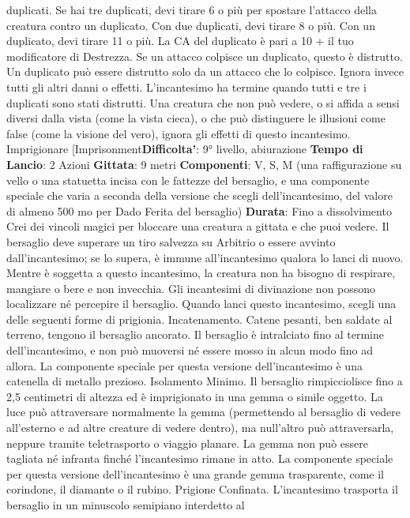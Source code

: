 \begin{multicols}{2}
duplicati.
Se hai tre duplicati, devi tirare 6 o più per spostare
l’attacco della creatura contro un duplicato. Con due
duplicati, devi tirare 8 o più. Con un duplicato, devi
tirare 11 o più.
La CA del duplicato è pari a 10 + il tuo modificatore di
Destrezza. Se un attacco colpisce un duplicato, questo
è distrutto. Un duplicato può essere distrutto solo da un
attacco che lo colpisce. Ignora invece tutti gli altri danni
o effetti. L’incantesimo ha termine quando tutti e tre i
duplicati sono stati distrutti.
Una creatura che non può vedere, o si affida a sensi
diversi dalla vista (come la vista cieca), o che può 
distinguere le illusioni come false (come la visione del
vero), ignora gli effetti di questo incantesimo.
Imprigionare
[Imprisonment\textbf{Difficolta'}:
9° livello, abiurazione
\textbf{Tempo di Lancio}: 2 Azioni
\textbf{Gittata}: 9 metri
\textbf{Componenti}: V, S, M (una raffigurazione su vello o una
statuetta incisa con le fattezze del bersaglio, e una
componente speciale che varia a seconda della
versione che scegli dell’incantesimo, del valore di
almeno 500 mo per Dado Ferita del bersaglio)
\textbf{Durata}: Fino a dissolvimento
Crei dei vincoli magici per bloccare una creatura a
gittata e che puoi vedere. Il bersaglio deve superare un
tiro salvezza su Arbitrio o essere avvinto
dall’incantesimo; se lo supera, è immune
all’incantesimo qualora lo lanci di nuovo. Mentre è
soggetta a questo incantesimo, la creatura non ha
bisogno di respirare, mangiare o bere e non invecchia.
Gli incantesimi di divinazione non possono localizzare
né percepire il bersaglio.
Quando lanci questo incantesimo, scegli una delle
seguenti forme di prigionia.
Incatenamento. Catene pesanti, ben saldate al
terreno, tengono il bersaglio ancorato. Il bersaglio è
intralciato fino al termine dell’incantesimo, e non può
muoversi né essere mosso in alcun modo fino ad allora.
La componente speciale per questa versione
dell’incantesimo è una catenella di metallo prezioso.
Isolamento Minimo. Il bersaglio rimpicciolisce fino a
2,5 centimetri di altezza ed è imprigionato in una
gemma o simile oggetto. La luce può attraversare
normalmente la gemma (permettendo al bersaglio di
vedere all’esterno e ad altre creature di vedere dentro),
ma null’altro può attraversarla, neppure tramite
teletrasporto o viaggio planare. La gemma non può
essere tagliata né infranta finché l’incantesimo rimane
in atto.
La componente speciale per questa versione
dell’incantesimo è una grande gemma trasparente,
come il corindone, il diamante o il rubino.
Prigione Confinata. L’incantesimo trasporta il
bersaglio in un minuscolo semipiano interdetto al

\end{multicols}
